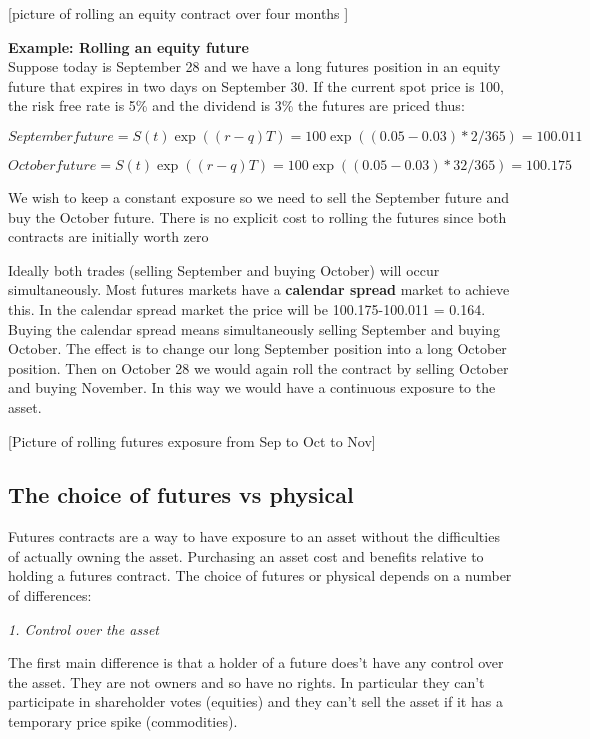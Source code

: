 \documentclass{tran-l}
\theoremstyle{definition}
\theoremstyle{remark}
\numberwithin{equation}{subsection}
\begin{document}
[picture of rolling an equity contract over four months ]

\medskip
\textbf{Example: Rolling an equity future}\\

Suppose today is September 28 and we have a long futures position in an equity future that expires in two days on September 30.  If the current spot price is 100, the risk free rate is 5\% and the dividend is 3\% the futures are priced thus:

\[ September future  = S(t)\exp((r-q)T) =  100 \exp ((0.05-0.03)*2/365) = 100.011 \]

\[ October future  = S(t)\exp((r-q)T) =  100 \exp ((0.05-0.03)*32/365) = 100.175 \]

We wish to keep a constant exposure so we need to sell the September future and buy the October future. There is no explicit cost to rolling the futures since both contracts are initially worth zero

Ideally both trades (selling September and buying October) will occur simultaneously. Most futures markets have a \textbf{calendar spread} market to achieve this. In the calendar spread market the price will be 100.175-100.011 = 0.164. Buying the calendar spread means simultaneously selling September and buying October. The effect is to change our long September position into a long October position. Then on October 28 we would again roll the contract by selling October and buying November. In this way we would have a continuous exposure to the asset.

[Picture  of rolling futures exposure from Sep to Oct to Nov]

\subsection{The choice of futures vs physical}

Futures contracts are a way to have exposure to an asset without the difficulties of actually owning the asset. Purchasing an asset cost and benefits relative to holding a futures contract. The choice of futures or physical depends on a number of differences:

\medskip \textit{1. Control over the asset }

The first main difference is that a holder of a future does't have any control over the asset. They are not owners and so have no rights. In particular they can't participate in shareholder votes (equities) and they can't sell the asset if it has a temporary price spike (commodities). 
\end{document}
